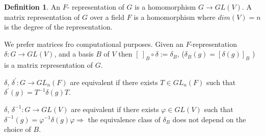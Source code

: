 \documentclass[12pt]{amsart}
\theoremstyle{definition}
\newtheorem{definition}[theorem]{Definition}
\begin{document}
\begin{definition} 
An $F$- representation of $G$ is a homomorphism $G \rightarrow GL(V)$. A matrix representation of $G$ over a field $F$ is a homomorphism where $dim(V) = n$ is the degree of the representation.
\end{definition} 

We prefer matrices fro computational purposes. Given an $F$-representation $\delta: G \rightarrow GL(V)$, and a basis $B$ of $V$ then $[ \  ]_{B} \circ \delta := \delta_{B}$, ($ \delta_{B} (g) = \left[ \delta (g) \right]_{B}$ ) is a matrix representation of $G$.

$\delta$, $\delta^{'}: G \rightarrow GL_{n} (F)$ are equivalent if there exists $T \in GL_{n} (F)$ such that $\delta^{'} (g) = T^{- 1} \delta (g) T$. 

$\delta$, $\delta^{- 1}: G \rightarrow GL(V)$ are equivalent if there exists $\varphi \in GL(V)$ such that $\delta^{- 1} (g) = \varphi^{- 1} \delta (g) \varphi \Rightarrow$ the equivalence class of $\delta_{B}$ does not depend on the choice of $B$. 
\end{document}
